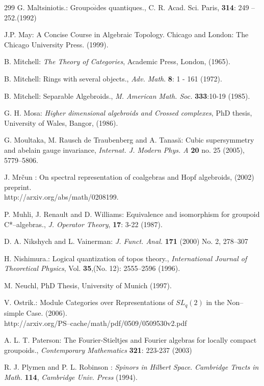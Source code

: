 \documentclass[12pt]{article}
\theoremstyle{plain}
\theoremstyle{definition}
\numberwithin{equation}{section}
\begin{document}
\begin{thebibliography} {299}
G. Maltsiniotis.: Groupo$\ddot{i}$des quantiques., C. R. Acad. Sci. Paris, \textbf{314}:
249 -- 252.(1992)

J.P. May: A Concise Course in Algebraic Topology. Chicago and London: The Chicago University
Press. (1999).

B. Mitchell: \emph{The Theory of Categories}, Academic Press,
London, (1965).

B. Mitchell: Rings with several objects., \textit{Adv. Math}. \textbf{8}: 1 - 161 (1972).

B. Mitchell: Separable Algebroids., {\em M. American Math. Soc.} \textbf{333}:10-19 (1985).

G. H. Mosa: \emph{Higher dimensional algebroids and Crossed
complexes}, PhD thesis, University of Wales, Bangor, (1986).

G. Moultaka, M. Rausch de Traubenberg and A. Tanas\u a: Cubic
supersymmetry and abelain gauge invariance, \emph{Internat. J.
Modern Phys. A} \textbf{20} no. 25 (2005), 5779--5806.

J. Mr\v cun : On spectral representation of coalgebras and Hopf
algebroids, (2002) preprint.\\ http://arxiv.org/abs/math/0208199.

P. Muhli, J. Renault and D. Williams: Equivalence and isomorphism for groupoid C*--algebras., \textit{J. Operator Theory}, \textbf{17}: 3-22 (1987).

D. A. Nikshych and L. Vainerman: \emph{J. Funct. Anal.}
\textbf{171} (2000) No. 2, 278--307

H. Nishimura.: Logical quantization of topos theory., \textit{International Journal of Theoretical Physics}, Vol. \textbf{35},(No. 12): 2555--2596 (1996).

M. Neuchl, PhD Thesis, University of Munich (1997).

V. Ostrik.: Module Categories over Representations of $SL_q(2)$
in the Non--simple Case. (2006).
\\ http://arxiv.org/PS--cache/math/pdf/0509/0509530v2.pdf

A. L. T. Paterson: The Fourier-Stieltjes and Fourier algebras for locally
compact groupoids., \textit{Contemporary Mathematics} \textbf{321}: 223-237 (2003)

R. J. Plymen and P. L. Robinson : {\em Spinors in Hilbert Space}.
\emph{Cambridge Tracts in Math.} \textbf{114}, \emph{Cambridge Univ. Press} (1994).


\end{thebibliography}
\end{document}
